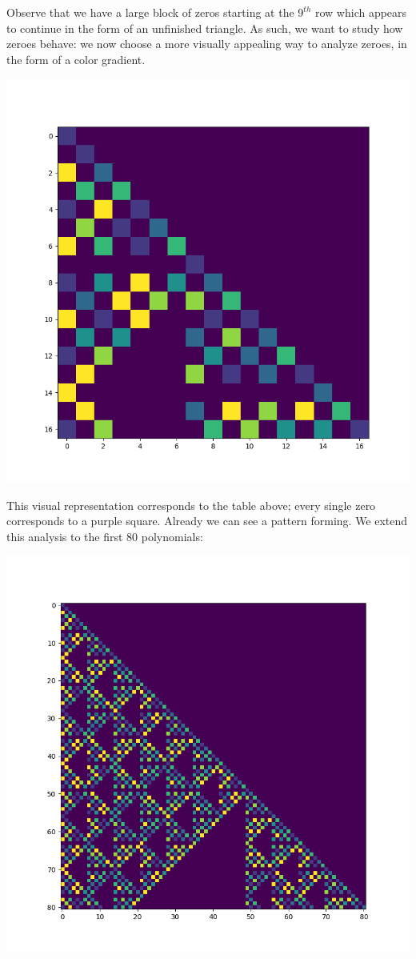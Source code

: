 \documentclass[12pt, letterpaper]{article} %
\begin{document}
Observe that we have a large block of zeros starting at the $9^{th}$ row which appears to continue in the form of an unfinished triangle. As such, we want to study how zeroes behave: we now choose a more visually appealing way to analyze zeroes, in the form of a color gradient.

  \begin{center}\includegraphics[scale=0.40]{16mod7.png}
  \end{center}

This visual representation corresponds to the table above; every single zero corresponds to a purple square. Already we can see a pattern forming. We extend this analysis to the first $80$ polynomials:

\begin{center}  \includegraphics[scale=0.40]{80mod7.png}
\end{center}
\end{document}

